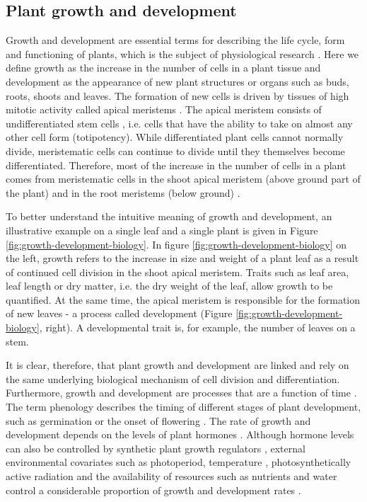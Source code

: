 \subsection{Plant growth and development}
\label{subsec:intro-plant-growth-dev}

Growth and development are essential terms for describing the life cycle, form and functioning of plants, which is the subject of physiological research \citep{leopold_plant_1964}. Here we define growth as the increase in the number of cells in a plant tissue and development as the appearance of new plant structures or organs such as buds, roots, shoots and leaves. The formation of new cells is driven by tissues of high mitotic activity called apical meristems \citep{sinnott_growth_1939}. The apical meristem consists of undifferentiated stem cells \citep{bowman_formation_2000}, i.e. cells that have the ability to take on almost any other cell form (totipotency). While differentiated plant cells cannot normally divide, meristematic cells can continue to divide until they themselves become differentiated. Therefore, most of the increase in the number of cells in a plant comes from meristematic cells in the shoot apical meristem (above ground part of the plant) and in the root meristems (below ground) \citep{kerstetter_shoot_1997}.

To better understand the intuitive meaning of growth and development, an illustrative example on a single leaf and a single plant is given in Figure \ref{fig:growth-development-biology}. In figure \ref{fig:growth-development-biology} on the left, growth refers to the increase in size and weight of a plant leaf as a result of continued cell division in the shoot apical meristem. Traits such as leaf area, leaf length or dry matter, i.e. the dry weight of the leaf, allow growth to be quantified. At the same time, the apical meristem is responsible for the formation of new leaves - a process called development (Figure \ref{fig:growth-development-biology}, right). A developmental trait is, for example, the number of leaves on a stem.

It is clear, therefore, that plant growth and development are linked and rely on the same underlying biological mechanism of cell division and differentiation. Furthermore, growth and development are processes that are a function of time \citep{prusinkiewicz_modeling_2004}. The term phenology describes the timing of different stages of plant development, such as germination or the onset of flowering \citep{piao_plant_2019}. The rate of growth and development depends on the levels of plant hormones \citep{shani_role_2006}. Although hormone levels can also be controlled by synthetic plant growth regulators \citep{gaspar_plant_1996}, external environmental covariates such as photoperiod, temperature \citep{porter_temperatures_1999}, photosynthetically active radiation \citep{abbate_effects_1995} and the availability of resources such as nutrients and water control a considerable proportion of growth and development rates \citep{masle_competition_1985,korner_paradigm_2015}.

